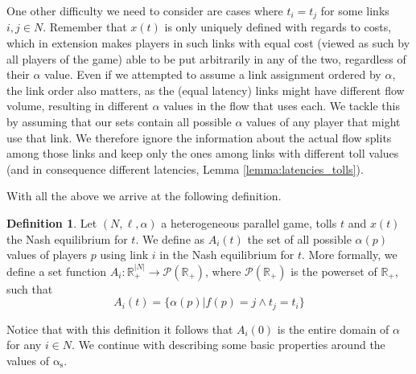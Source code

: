 \documentclass[10pt,a4paper]{book}
\newcommand{\as}{\mathrm{\alpha_s}}
\newcommand{\R}{\mathbb{R}}
\theoremstyle{definition}
\newtheorem{definition}{Definition}[chapter]
\theoremstyle{comment}
\begin{document}
One other difficulty we need to consider are cases where $t_i = t_j$ for some links $i, j \in N$.
Remember that $x(t)$ is only uniquely defined with regards to costs, which in extension makes players in such links with equal cost (viewed as such by all players of the game) able to be put arbitrarily in any of the two, regardless of their $\alpha$ value.
Even if we attempted to assume a link assignment ordered by $\alpha$, the link order also matters, as the (equal latency) links might have different flow volume, resulting in different $\alpha$ values in the flow that uses each.
We tackle this by assuming that our sets contain all possible $\alpha$ values of any player that might use that link.
We therefore ignore the information about the actual flow splits among those links and keep only the ones among links with different toll values (and in consequence different latencies, Lemma \ref{lemma:latencies_tolls}).

With all the above we arrive at the following definition.

\begin{definition}
	\label{definition:alpha_flow_sets}
	Let $(N, \ell, \alpha)$ a heterogeneous parallel game, tolls $t$ and $x(t)$ the Nash equilibrium for $t$.
	We define as $A_i(t)$ the set of all possible $\alpha(p)$ values of players $p$ using link $i$ in the Nash equilibrium for $t$.
	More formally, we define a set function $A_i: \R_+^{|N|} \rightarrow \mathcal{P}(\R_+)$, where $\mathcal{P}(\R_+)$ is the powerset of $\R_+$, such that
	\[A_i(t) = \{\alpha(p) | f(p) = j \wedge t_j = t_i\}\]
\end{definition}

Notice that with this definition it follows that $A_i(0)$ is the entire domain of $\alpha$ for any $i \in N$.
We continue with describing some basic properties around the values of $\as$.

\end{document}
